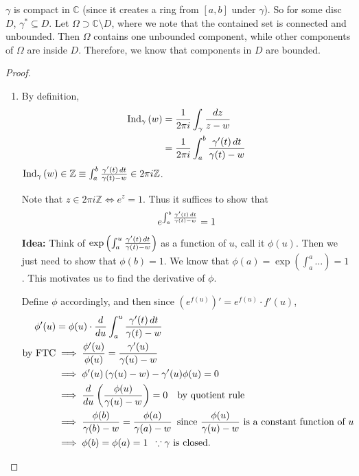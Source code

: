\documentclass[notoc,notitlepage]{tufte-book}
\begin{document}
\begin{note}
	$\gamma$ is compact in $\mathbb{C}$ (since it creates a ring from $[a, b]$ under $\gamma$). So for some disc $D$, $\gamma^* \subseteq D$. Let $\Omega \supset \mathbb{C} \setminus D$, where we note that the contained set is connected and unbounded. Then $\Omega$ contains one unbounded component, while other components of $\Omega$ are inside $D$. Therefore, we know that components in $D$ are bounded.
\end{note}

\begin{proof}
	\begin{enumerate}
		\item By definition,
		\begin{align*}
			\operatorname{Ind}_{\gamma}\left( w \right)
				&= \frac{1}{2 \pi i } \int_{\gamma} \frac{\mathop{}\!d{z}}{z - w} \\
				&= \frac{1}{2 \pi i} \int_{a}^{b} \frac{\gamma'(t) \mathop{}\!d{t}}{\gamma(t) - w} 
		\end{align*}
		 $\operatorname{Ind}_{\gamma}\left( w \right) \in \mathbb{Z} \equiv \int_{a}^{b} \frac{\gamma'(t) \mathop{}\!d{t}}{\gamma(t) - w} \in 2 \pi i \mathbb{Z}$.

		Note that $z \in 2 \pi i \mathbb{Z} \iff e^z = 1$. Thus it suffices to show that
		\begin{equation*}
			e^{\int_{a}^{b} \frac{\gamma'(t) \mathop{}\!d{t}}{\gamma(t) - w}} = 1
		\end{equation*}

		\textbf{Idea: } Think of $\exp\left(\int_{a}^{u} \frac{\gamma'(t) \mathop{}\!d{t}}{\gamma(t) - w}\right)$ as a function of $u$, call it $\phi(u)$. Then we just need to show that $\phi(b) = 1$. We know that $\phi(a) = \exp\left(\int_{a}^{a} \hdots \right) = 1$. This motivates us to find the derivative of $\phi$.

		Define $\phi$ accordingly, and then since $(e^{f(u)})' = e^{f(u)} \cdot f'(u)$,
		\begin{align*}
			\phi'(u) &= \phi(u) \cdot \frac{d}{du} \int_{a}^{u} \frac{\gamma'(t) \mathop{}\!d{t}}{\gamma(t) - w} \\
			\text{by FTC} &\implies \frac{\phi'(u)}{\phi(u)} = \frac{\gamma'(u)}{\gamma(u) - w} \\
			&\implies \phi'(u) \left( \gamma(u) - w \right) - \gamma'(u) \phi(u) = 0 \\
			&\implies \frac{d}{du} \left( \frac{\phi(u)}{\gamma(u) - w} \right) = 0 \quad \text{by quotient rule} \\
			&\implies \frac{\phi(b)}{\gamma(b) - w} = \frac{\phi(a)}{\gamma(a) - w} \enspace \text{since } \frac{\phi(u)}{\gamma(u) - w} \text{ is a constant function of } u \\
			&\implies \phi(b) = \phi(a) = 1 \enspace \because \gamma \text{ is closed.}
		\end{align*}


\end{enumerate}
\end{proof}
\end{document}
